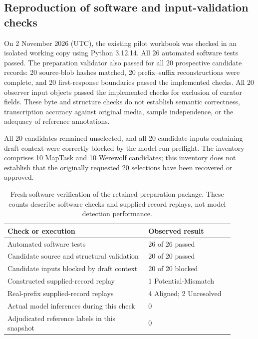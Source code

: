 
\subsection{Reproduction of software and input-validation checks}
\label{sec:cim5-fresh-software-validation}

On 2 November 2026 (UTC), the existing pilot workbook was checked in an
isolated working copy using Python 3.12.14. All 26 automated software tests
passed. The preparation validator also passed for all 20 prospective
candidate records: 20 source-blob hashes matched, 20 prefix--suffix
reconstructions were complete, and 20 first-response boundaries passed
the implemented checks. All 20 observer input objects passed the
implemented checks for exclusion of curator fields. These byte and
structure checks do not establish semantic correctness, transcription
accuracy against original media, sample independence, or the adequacy
of reference annotations.

All 20 candidates remained unselected, and all 20 candidate inputs
containing draft context were correctly blocked by the model-run
preflight. The inventory comprises
10 MapTask and 10 Werewolf candidates; this inventory does not establish
that the originally requested 20 selections have been recovered or approved.

\begin{table}[htbp]
\centering
\small
\caption{Fresh software verification of the retained preparation package.
These counts describe software checks and supplied-record replays,
not model detection performance.}
\label{tab:cim5-fresh-software-validation}
\begin{tabular}{p{0.56\linewidth}p{0.34\linewidth}}
\hline
Check or execution & Observed result \\
\hline
Automated software tests & 26 of 26 passed \\
Candidate source and structural validation & 20 of 20 passed \\
Candidate inputs blocked by draft context & 20 of 20 blocked \\
Constructed supplied-record replay & 1 Potential-Mismatch \\
Real-prefix supplied-record replays & 4 Aligned; 2 Unresolved \\
Actual model inferences during this check & 0 \\
Adjudicated reference labels in this snapshot & 0 \\
\hline
\end{tabular}
\end{table}

